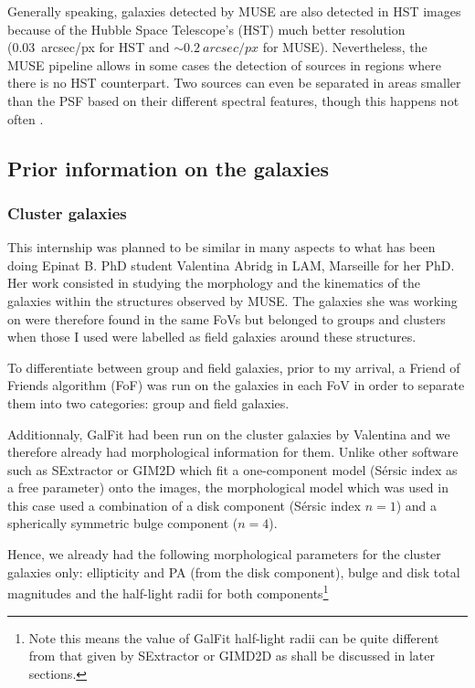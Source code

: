 Generally speaking, galaxies detected by MUSE are also detected in HST images because of the Hubble Space Telescope's (HST) much better resolution (\SI{0.03}{arcsec/px} for HST and $\sim \SI{0.2}{arcsec/px}$ for MUSE). Nevertheless, the MUSE pipeline allows in some cases the detection of sources in regions where there is no HST counterpart. Two sources can even be separated in areas smaller than the PSF based on their different spectral features, though this happens not often .

\subsection{Prior information on the galaxies}

\subsubsection{Cluster galaxies}

This internship was planned to be similar in many aspects to what has been doing Epinat B. PhD student Valentina Abridg in LAM, Marseille for her PhD. Her work consisted in studying the morphology and the kinematics of the galaxies within the structures observed by MUSE. The galaxies she was working on were therefore found in the same FoVs but belonged to groups and clusters when those I used were labelled as field galaxies around these structures. 

To differentiate between group and field galaxies, prior to my arrival, a Friend of Friends algorithm (FoF) was run on the galaxies in each FoV in order to separate them into two categories: group and field galaxies.

Additionnaly, GalFit had been run on the cluster galaxies by Valentina and we therefore already had morphological information for them.
Unlike other software such as SExtractor or GIM2D which fit a one-component model (Sérsic index as a free parameter) onto the images, the morphological model which was used in this case used a combination of a disk component (Sérsic index $n=1$) and a spherically symmetric bulge component ($n=4$). 

Hence, we already had the following morphological parameters for the cluster galaxies only: ellipticity and PA (from the disk component), bulge and disk total magnitudes and the half-light radii for both components\footnote{Note this means the value of GalFit half-light radii can be quite different from that given by SExtractor or GIMD2D as shall be discussed in later sections. }

